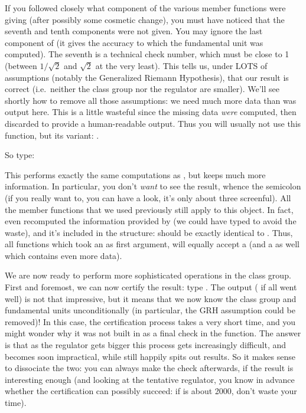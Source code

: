 If you followed closely what component of  the various member
functions were giving (after possibly some cosmetic change), you must have
noticed that the seventh and tenth components were not given. You may ignore
the last component of  (it gives the accuracy to which the fundamental
unit was computed).  The seventh is a technical check number, which must be
close to 1 (between $1/\sqrt2$ and $\sqrt2$ at the very least). This tells
us, under LOTS of assumptions (notably the Generalized Riemann Hypothesis),
that our result is correct (i.e.~neither the class group nor the regulator are
smaller). We'll see shortly how to remove all those assumptions: we need much
more data than was output here. This is a little wasteful since the missing
data \emph{were} computed, then discarded to provide a human-readable output.
Thus you will usually not use this function, but its  variant:
.
\smallskip

So type: 

This performs exactly the same computations as , but keeps
much more information. In particular, you don't \emph{want} to see the result,
whence the semicolon (if you really want to, you can have a look, it's only
about three screenful). All the member functions that we used previously
still apply to this  object. In fact,  even recomputed
the information provided by  (we could have typed
 to avoid the waste), and it's included in the 
structure:  should be exactly identical to . Thus, all
functions which took an  as first argument, will equally accept a
 (and a  as well which contains even more data).

We are now ready to perform more sophisticated operations in the class group.
First and foremost, we can now certify the result: type
. The output ( if all went well) is not that
impressive, but it means that we now know the class group and fundamental
units unconditionally (in particular, the GRH assumption could be removed)!
In this case, the certification process takes a very short time, and you
might wonder why it was not built in as a final check in the 
function. The answer is that as the regulator gets bigger this process gets
increasingly difficult, and becomes soon impractical, while 
still happily spits out results. So it makes sense to dissociate the two: you
can always make the check afterwards, if the result is interesting enough
(and looking at the tentative regulator, you know in advance whether the
certification can possibly succeed: if  is about 2000, don't
waste your time).

